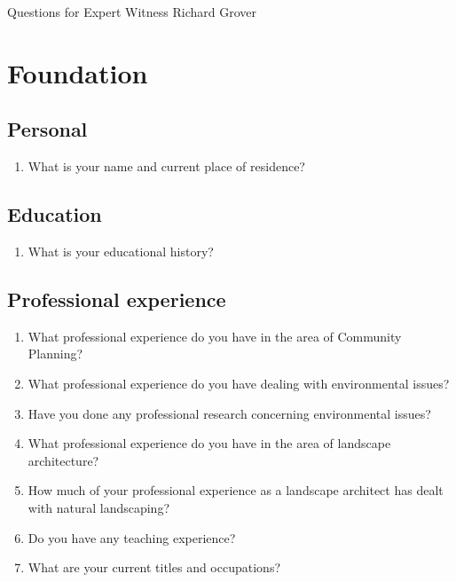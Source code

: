\documentclass[12pt]{article}
\begin{document}
\begin{center}
{\Huge Questions for Expert Witness Richard Grover}
\end{center}



\section{Foundation}

\subsection{Personal}

\begin{enumerate}
\item What is your name and current place of residence?
\end{enumerate}

\subsection{Education}
\begin{enumerate}
\item What is your educational history?
\end{enumerate}

\subsection{Professional experience}
\begin{enumerate}
\item What professional experience do you have in the area of Community Planning?
\item What professional experience do you have dealing with environmental issues?
\item Have you done any professional research concerning environmental issues?
\item What professional experience do you have in the area of landscape architecture?

\item How much of your professional experience as a landscape architect has dealt with natural landscaping?

\item Do you have any teaching experience?

\item What are your current titles and occupations?
\end{enumerate}
\end{document}
